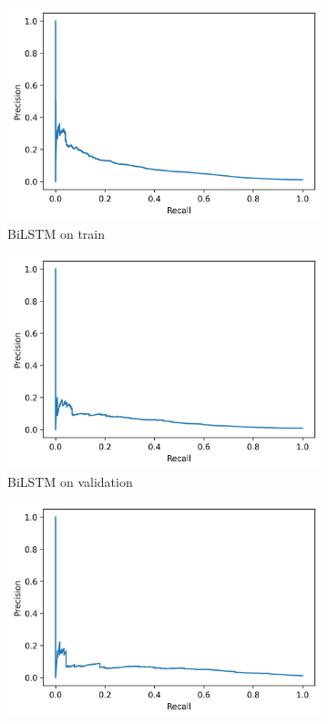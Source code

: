 \documentclass[utf8x]{ctexart}
\begin{document}
\begin{figure}[htb]
  \centering
  \begin{subfigure}[b]{0.32\textwidth}
    \centering
    \includegraphics[width=\textwidth]{../images/BiLSTM_train_prc.png}
    \caption{BiLSTM on train}
    \label{fig:BiLSTM_prc_train}
  \end{subfigure}
  \begin{subfigure}[b]{0.32\textwidth}
    \centering
    \includegraphics[width=\textwidth]{../images/BiLSTM_val_prc.png}
    \caption{BiLSTM on validation}
    \label{fig:BiLSTM_prc_val}
  \end{subfigure}
  \begin{subfigure}[b]{0.32\textwidth}
    \centering
    \includegraphics[width=\textwidth]{../images/BiLSTM_test_prc.png}

\end{subfigure}
\end{figure}
\end{document}
